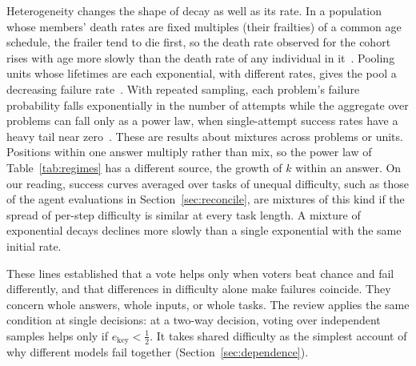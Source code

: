\documentclass{ieeeaccess}
\begin{document}
Heterogeneity changes the shape of decay as well as its rate. In a population whose members' death rates are fixed multiples (their frailties) of a common age schedule, the frailer tend to die first, so the death rate observed for the cohort rises with age more slowly than the death rate of any individual in it~\cite{vaupel1979impact}. Pooling units whose lifetimes are each exponential, with different rates, gives the pool a decreasing failure rate~\cite{proschan1963theoretical}. With repeated sampling, each problem's failure probability falls exponentially in the number of attempts while the aggregate over problems can fall only as a power law, when single-attempt success rates have a heavy tail near zero~\cite{schaeffer2025monkeys}. These are results about mixtures across problems or units. Positions within one answer multiply rather than mix, so the power law of Table~\ref{tab:regimes} has a different source, the growth of $k$ within an answer. On our reading, success curves averaged over tasks of unequal difficulty, such as those of the agent evaluations in Section~\ref{sec:reconcile}, are mixtures of this kind if the spread of per-step difficulty is similar at every task length. A mixture of exponential decays declines more slowly than a single exponential with the same initial rate.

These lines established that a vote helps only when voters beat chance and fail differently, and that differences in difficulty alone make failures coincide. They concern whole answers, whole inputs, or whole tasks. The review applies the same condition at single decisions: at a two-way decision, voting over independent samples helps only if $e_{\text{key}}<\tfrac12$. It takes shared difficulty as the simplest account of why different models fail together (Section~\ref{sec:dependence}).
\end{document}
